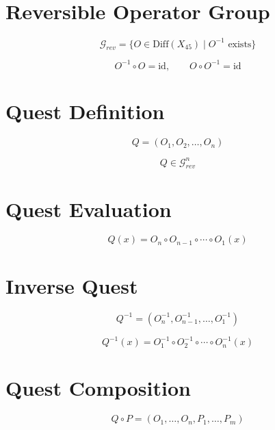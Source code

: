 
\section*{Reversible Operator Group}

\[
\mathcal{G}_{rev}
= \{ O \in \mathrm{Diff}(X_{45}) \mid O^{-1} \text{ exists} \}
\]

\[
O^{-1} \circ O = \mathrm{id},\qquad
O \circ O^{-1} = \mathrm{id}
\]


\section*{Quest Definition}

\[
Q = (O_1, O_2, \ldots, O_n)
\]

\[
Q \in \mathcal{G}_{rev}^n
\]


\section*{Quest Evaluation}

\[
Q(x)
= O_n \circ O_{n-1} \circ \cdots \circ O_1 (x)
\]


\section*{Inverse Quest}

\[
Q^{-1}
= (O_n^{-1}, O_{n-1}^{-1}, \ldots, O_1^{-1})
\]

\[
Q^{-1}(x)
= O_1^{-1} \circ O_2^{-1} \circ \cdots \circ O_n^{-1}(x)
\]


\section*{Quest Composition}

\[
Q \circ P
= (O_1, \ldots, O_n, P_1, \ldots, P_m)
\]


